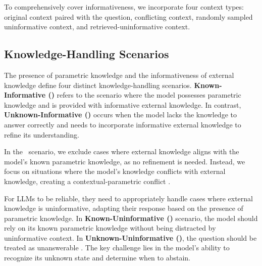 To comprehensively cover informativeness, we incorporate four context types: original context paired with the question, conflicting context, randomly sampled uninformative context, and retrieved-uninformative context.


\subsection{Knowledge-Handling Scenarios}


The presence of parametric knowledge and the informativeness of external knowledge define four distinct knowledge-handling scenarios.
\textbf{Known-Informative (\KI)} refers to the scenario where the model possesses parametric knowledge and is provided with informative external knowledge.
In contrast, \textbf{Unknown-Informative (\UI)} occurs when the model lacks the knowledge to answer correctly and needs to incorporate informative external knowledge to refine its understanding.


In the \KI\ scenario, we exclude cases where external knowledge aligns with the model's known parametric knowledge, as no refinement is needed.
Instead, we focus on situations where the model's knowledge conflicts with external knowledge, creating a contextual-parametric conflict \citep{xu-etal-2024-knowledge-conflicts}.




For LLMs to be reliable, they need to appropriately handle cases where external knowledge is uninformative, adapting their response based on the presence of parametric knowledge.
In \textbf{Known-Uninformative (\KU)} scenario, the model should rely on its known parametric knowledge without being distracted by uninformative context.
In \textbf{Unknown-Uninformative (\UU)}, the question should be treated as unanswerable \citep{wen2025knowlimitssurveyabstention}.
The key challenge lies in the model's ability to recognize its unknown state and determine when to abstain.



